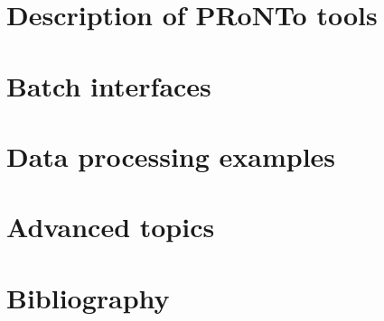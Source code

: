 \documentclass[a4paper,titlepage]{book}
\begin{document}

\dominitoc 
\tableofcontents
\newpage



\part{Description of PRoNTo tools}
\label{sec:GUI}







\part{Batch interfaces}
\label{sec:BATCH}






\part{Data processing examples}






\part{Advanced topics}
\label{sec:ADVTOP}





\part{Bibliography}

\end{document}
